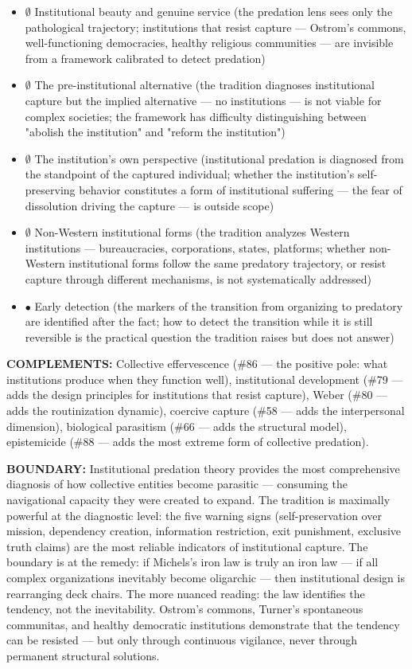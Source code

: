 \begin{itemize}[nosep,leftmargin=*]
  \item $\emptyset$ Institutional beauty and genuine service (the predation lens sees only the pathological trajectory; institutions that resist capture — Ostrom's commons, well-functioning democracies, healthy religious communities — are invisible from a framework calibrated to detect predation)
  \item $\emptyset$ The pre-institutional alternative (the tradition diagnoses institutional capture but the implied alternative — no institutions — is not viable for complex societies; the framework has difficulty distinguishing between "abolish the institution" and "reform the institution")
  \item $\emptyset$ The institution's own perspective (institutional predation is diagnosed from the standpoint of the captured individual; whether the institution's self-preserving behavior constitutes a form of institutional suffering — the fear of dissolution driving the capture — is outside scope)
  \item $\emptyset$ Non-Western institutional forms (the tradition analyzes Western institutions — bureaucracies, corporations, states, platforms; whether non-Western institutional forms follow the same predatory trajectory, or resist capture through different mechanisms, is not systematically addressed)
  \item $\bullet$ Early detection (the markers of the transition from organizing to predatory are identified after the fact; how to detect the transition while it is still reversible is the practical question the tradition raises but does not answer)
\end{itemize}


\textbf{COMPLEMENTS:} Collective effervescence (\#86 — the positive pole: what institutions produce when they function well), institutional development (\#79 — adds the design principles for institutions that resist capture), Weber (\#80 — adds the routinization dynamic), coercive capture (\#58 — adds the interpersonal dimension), biological parasitism (\#66 — adds the structural model), epistemicide (\#88 — adds the most extreme form of collective predation).


\textbf{BOUNDARY:} Institutional predation theory provides the most comprehensive diagnosis of how collective entities become parasitic — consuming the navigational capacity they were created to expand. The tradition is maximally powerful at the diagnostic level: the five warning signs (self-preservation over mission, dependency creation, information restriction, exit punishment, exclusive truth claims) are the most reliable indicators of institutional capture. The boundary is at the remedy: if Michels's iron law is truly an iron law — if all complex organizations inevitably become oligarchic — then institutional design is rearranging deck chairs. The more nuanced reading: the law identifies the tendency, not the inevitability. Ostrom's commons, Turner's spontaneous communitas, and healthy democratic institutions demonstrate that the tendency can be resisted — but only through continuous vigilance, never through permanent structural solutions.


